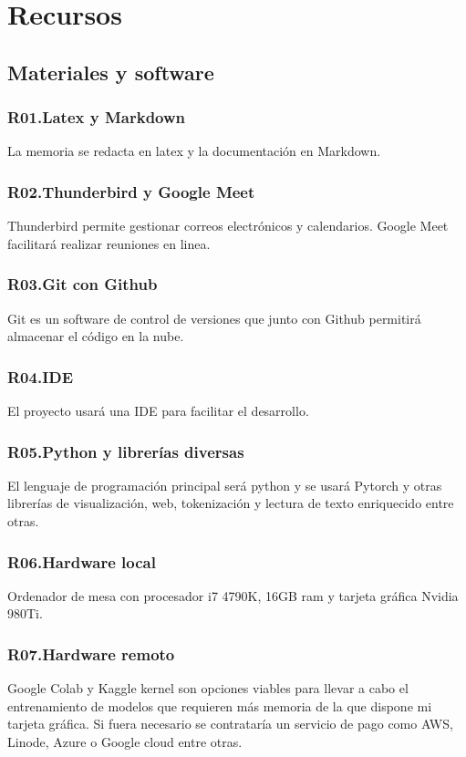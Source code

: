 \section{Recursos}
\subsection{Materiales y software}
\subsubsection{R01.\quad Latex y Markdown}\label{R01} La memoria se redacta en latex y la documentación en Markdown.
\subsubsection{R02.\quad Thunderbird y Google Meet}\label{R02} Thunderbird permite gestionar
correos electrónicos y calendarios. Google Meet facilitará realizar reuniones en linea.
\subsubsection{R03.\quad Git con Github}\label{R03} Git es un software de control de versiones que junto con Github
permitirá almacenar el código en la nube.
\subsubsection{R04.\quad IDE}\label{R04} El proyecto usará una IDE para facilitar el desarrollo.
\subsubsection{R05.\quad Python y librerías diversas}\label{R05} El lenguaje de programación principal será python y 
se usará Pytorch y otras librerías de visualización, web, tokenización y lectura de texto enriquecido entre otras.
\subsubsection{R06.\quad Hardware local}\label{R06} Ordenador de mesa con procesador i7 4790K, 16GB ram y tarjeta gráfica
Nvidia 980Ti.
\subsubsection{R07.\quad Hardware remoto}\label{R07} Google Colab y Kaggle kernel son opciones viables para llevar a cabo el entrenamiento
de modelos que requieren más memoria de la que dispone mi tarjeta gráfica.
Si fuera necesario se contrataría un servicio de pago como AWS, Linode, Azure o Google
cloud entre otras.

